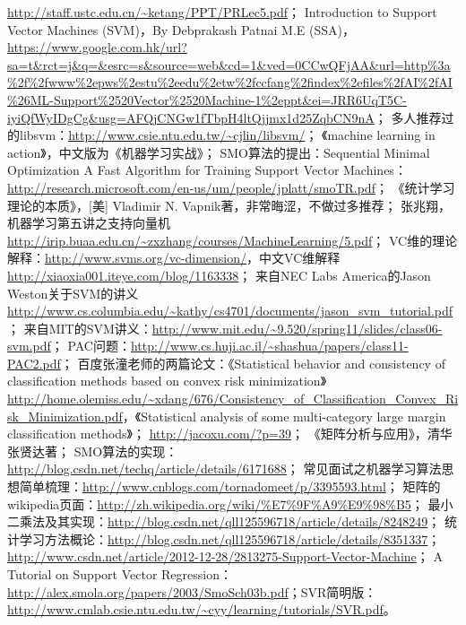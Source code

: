 \documentclass[a4paper,12pt]{article}
\begin{document}
\begin{thebibliography}{11}
\bibitem{}  \url{http://staff.ustc.edu.cn/~ketang/PPT/PRLec5.pdf}；
\bibitem{}  Introduction to Support Vector Machines (SVM)，By Debprakash Patnai M.E (SSA)，\url{https://www.google.com.hk/url?sa=t&rct=j&q=&esrc=s&source=web&cd=1&ved=0CCwQFjAA&url=http%3a%2f%2fwww%2epws%2estu%2eedu%2etw%2fccfang%2findex%2efiles%2fAI%2fAI%26ML-Support%2520Vector%2520Machine-1%2eppt&ei=JRR6UqT5C-iyiQfWyIDgCg&usg=AFQjCNGw1fTbpH4ltQjjmx1d25ZqbCN9nA}；
\bibitem{}  多人推荐过的libsvm：\url{http://www.csie.ntu.edu.tw/~cjlin/libsvm/}；
\bibitem{}  《machine learning in action》，中文版为《机器学习实战》；
\bibitem{}  SMO算法的提出：Sequential Minimal Optimization A Fast Algorithm for Training Support Vector Machines：\url{http://research.microsoft.com/en-us/um/people/jplatt/smoTR.pdf}；
\bibitem{}  《统计学习理论的本质》，[美] Vladimir N. Vapnik著，非常晦涩，不做过多推荐；
\bibitem{}  张兆翔，机器学习第五讲之支持向量机\url{http://irip.buaa.edu.cn/~zxzhang/courses/MachineLearning/5.pdf}；
\bibitem{}  VC维的理论解释：\url{http://www.svms.org/vc-dimension/}，中文VC维解释\url{http://xiaoxia001.iteye.com/blog/1163338}；
\bibitem{}  来自NEC Labs America的Jason Weston关于SVM的讲义\url{http://www.cs.columbia.edu/~kathy/cs4701/documents/jason_svm_tutorial.pdf}；
\bibitem{}  来自MIT的SVM讲义：\url{http://www.mit.edu/~9.520/spring11/slides/class06-svm.pdf}；
\bibitem{}  PAC问题：\url{http://www.cs.huji.ac.il/~shashua/papers/class11-PAC2.pdf}；
\bibitem{}  百度张潼老师的两篇论文：《Statistical behavior and consistency of classification methods based on convex risk minimization》\url{http://home.olemiss.edu/~xdang/676/Consistency_of_Classification_Convex_Risk_Minimization.pdf}，《Statistical analysis of some multi-category large margin classification methods》；
\bibitem{}  \url{http://jacoxu.com/?p=39}；
\bibitem{}  《矩阵分析与应用》，清华张贤达著；
\bibitem{}  SMO算法的实现：\url{http://blog.csdn.net/techq/article/details/6171688}；
\bibitem{}  常见面试之机器学习算法思想简单梳理：\url{http://www.cnblogs.com/tornadomeet/p/3395593.html}；
\bibitem{}  矩阵的wikipedia页面：\url{http://zh.wikipedia.org/wiki/%E7%9F%A9%E9%98%B5}；
\bibitem{}  最小二乘法及其实现：\url{http://blog.csdn.net/qll125596718/article/details/8248249}；
\bibitem{}  统计学习方法概论：\url{http://blog.csdn.net/qll125596718/article/details/8351337}；
\bibitem{}  \url{http://www.csdn.net/article/2012-12-28/2813275-Support-Vector-Machine}；
\bibitem{}  A Tutorial on Support Vector Regression：\url{http://alex.smola.org/papers/2003/SmoSch03b.pdf}；SVR简明版：\url{http://www.cmlab.csie.ntu.edu.tw/~cyy/learning/tutorials/SVR.pdf}。

\end{thebibliography}
\end{document}
